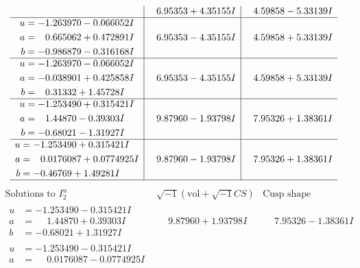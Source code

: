 \documentclass[1p]{elsarticle_modified}
\theoremstyle{definition}
\newcommand{\I}{\sqrt{-1}}
\begin{document}
$$\begin{array}{c|c|c}
 & \phantom{-}6.95353 + 4.35155 I & \phantom{-}4.59858 - 5.33139 I \\ \hline\begin{aligned}
u &= -1.263970 - 0.066052 I \\
a &= \phantom{-}0.665062 + 0.472891 I \\
b &= -0.986879 - 0.316168 I\end{aligned}
 & \phantom{-}6.95353 - 4.35155 I & \phantom{-}4.59858 + 5.33139 I \\ \hline\begin{aligned}
u &= -1.263970 - 0.066052 I \\
a &= -0.038901 + 0.425858 I \\
b &= \phantom{-}0.31332 + 1.45728 I\end{aligned}
 & \phantom{-}6.95353 - 4.35155 I & \phantom{-}4.59858 + 5.33139 I \\ \hline\begin{aligned}
u &= -1.253490 + 0.315421 I \\
a &= \phantom{-}1.44870 - 0.39303 I \\
b &= -0.68021 - 1.31927 I\end{aligned}
 & \phantom{-}9.87960 - 1.93798 I & \phantom{-}7.95326 + 1.38361 I \\ \hline\begin{aligned}
u &= -1.253490 + 0.315421 I \\
a &= \phantom{-}0.0176087 + 0.0774925 I \\
b &= -0.46769 + 1.49281 I\end{aligned}
 & \phantom{-}9.87960 - 1.93798 I & \phantom{-}7.95326 + 1.38361 I\\
 \hline 
 \end{array}$$\newpage$$\begin{array}{c|c|c}  
\text{Solutions to }I^u_{2}& \I (\text{vol} + \sqrt{-1}CS) & \text{Cusp shape}\\
 \hline 
\begin{aligned}
u &= -1.253490 - 0.315421 I \\
a &= \phantom{-}1.44870 + 0.39303 I \\
b &= -0.68021 + 1.31927 I\end{aligned}
 & \phantom{-}9.87960 + 1.93798 I & \phantom{-}7.95326 - 1.38361 I \\ \hline\begin{aligned}
u &= -1.253490 - 0.315421 I \\
a &= \phantom{-}0.0176087 - 0.0774925 I \\

\end{aligned}
\end{array}$$
\end{document}
